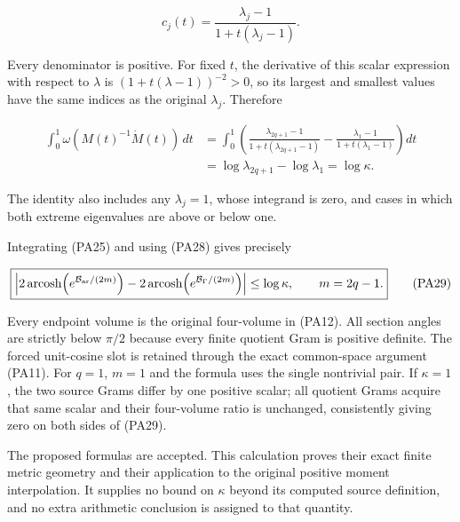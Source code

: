 \[
c_j(t)=\frac{\lambda_j-1}{1+t(\lambda_j-1)}.
\tag{PA27}
\]

Every denominator is positive. For fixed \(t\), the derivative of this scalar expression with respect to \(\lambda\) is \((1+t(\lambda-1))^{-2}>0\), so its largest and smallest values have the same indices as the original \(\lambda_j\). Therefore

\[
\begin{aligned}
\int_0^1\omega(M(t)^{-1}\dot M(t))\,dt
&=\int_0^1\left(
\frac{\lambda_{2q+1}-1}{1+t(\lambda_{2q+1}-1)}
-\frac{\lambda_1-1}{1+t(\lambda_1-1)}\right)dt\\
&=\log\lambda_{2q+1}-\log\lambda_1
=\log\kappa.
\end{aligned}
\tag{PA28}
\]

The identity also includes any \(\lambda_j=1\), whose integrand is zero, and cases in which both extreme eigenvalues are above or below one.

Integrating (PA25) and using (PA28) gives precisely

\[
\boxed{
\left|
2\operatorname{arcosh}\!\left(e^{\mathcal B_{\rm ar}/(2m)}\right)
-2\operatorname{arcosh}\!\left(e^{\mathcal B_\Gamma/(2m)}\right)
\right|
\le\log\kappa,
\qquad m=2q-1.
}
\tag{PA29}
\]

Every endpoint volume is the original four-volume in (PA12). All section angles are strictly below \(\pi/2\) because every finite quotient Gram is positive definite. The forced unit-cosine slot is retained through the exact common-space argument (PA11). For \(q=1\), \(m=1\) and the formula uses the single nontrivial pair. If \(\kappa=1\), the two source Grams differ by one positive scalar; all quotient Grams acquire that same scalar and their four-volume ratio is unchanged, consistently giving zero on both sides of (PA29).

The proposed formulas are accepted. This calculation proves their exact finite metric geometry and their application to the original positive moment interpolation. It supplies no bound on \(\kappa\) beyond its computed source definition, and no extra arithmetic conclusion is assigned to that quantity.

\endgroup


\endgroup
